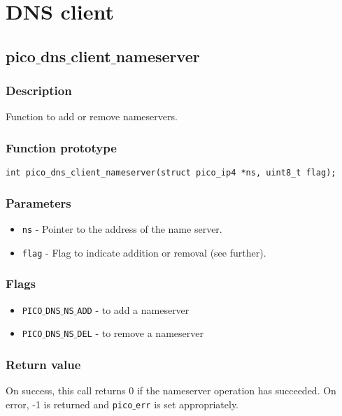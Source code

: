 \section{DNS client}



\subsection{pico$\_$dns$\_$client$\_$nameserver}

\subsubsection*{Description}
Function to add or remove nameservers.

\subsubsection*{Function prototype}
\begin{verbatim}
int pico_dns_client_nameserver(struct pico_ip4 *ns, uint8_t flag);
\end{verbatim}

\subsubsection*{Parameters}
\begin{itemize}[noitemsep]
\item \texttt{ns} - Pointer to the address of the name server.
\item \texttt{flag} - Flag to indicate addition or removal (see further).
\end{itemize}

\subsubsection*{Flags}
\begin{itemize}[noitemsep]
\item \texttt{PICO$\_$DNS$\_$NS$\_$ADD} - to add a nameserver
\item \texttt{PICO$\_$DNS$\_$NS$\_$DEL} - to remove a nameserver
\end{itemize}

\subsubsection*{Return value}
On success, this call returns 0 if the nameserver operation has succeeded.
On error, -1 is returned and \texttt{pico$\_$err} is set appropriately.

